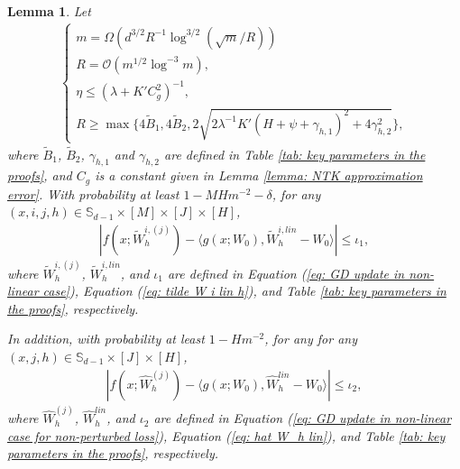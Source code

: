 \documentclass{article} \usepackage{iclr2023/iclr2023_conference,times}
\newtheorem{lemma}{Lemma}[section]
\begin{document}
\begin{lemma}
Let 
\begin{align}
\begin{cases}
m = \Omega \left( d^{3/2}  R^{-1} \log^{3/2} (\sqrt{m} / R) \right) \\
      R = \mathcal{O} \left( m^{1/2} \log^{-3} m \right), \\ 
\eta \leq (\lambda + K' C_g^2)^{-1}, \\
R \geq \max\{ 4 \tilde{B}_1, 4 \tilde{B}_2, 2 \sqrt{2\lambda^{-1}K' (H + \psi + \gamma_{h,1})^2 + 4 \gamma_{h,2}^2} \},
\end{cases}
\label{equation: conditions for R and eta final version}
\end{align}
where $\tilde{B}_1$, $\tilde{B}_2$, $\gamma_{h,1}$ and $\gamma_{h,2}$ are defined in Table \ref{tab: key parameters in the proofs}, and $C_g$ is a constant given in Lemma \ref{lemma: NTK approximation error}. 
With probability at least $1 - M H m^{-2} - \delta$, for any $(x, i,j,h)  \in \mathbb{S}_{d-1} \times [M] \times [J] \times [H]$, 
\begin{align*}
    |f(x; \tilde{W}^{i,(j)}_h) - \langle g(x; W_0), \tilde{W}_h^{i,lin} - W_0 \rangle| \leq \iota_1,
\end{align*}
where $ \tilde{W}^{i,(j)}_h$, $\tilde{W}_h^{i,lin}$, and $\iota_1$ are defined in Equation (\ref{eq: GD update in non-linear case}), Equation (\ref{eq: tilde W i lin h}), and Table \ref{tab: key parameters in the proofs}, respectively. 

In addition, with probability at least $1 -  H m^{-2}$, for any for any $(x,j,h)  \in \mathbb{S}_{d-1} \times [J] \times [H]$,
\begin{align*}
    |f(x; \hat{W}_h^{(j)}) - \langle g(x; W_0), \hat{W}_h^{lin} - W_0 \rangle| \leq \iota_2,
\end{align*}
where $ \hat{W}^{(j)}_h$, $\hat{W}_h^{lin}$, and $\iota_2$ are defined in Equation (\ref{eq: GD update in non-linear case for non-perturbed loss}), Equation (\ref{eq: hat W_h lin}), and Table \ref{tab: key parameters in the proofs}, respectively. 
\label{lemma: linear approximation of neural functions}
\end{lemma}
\end{document}
